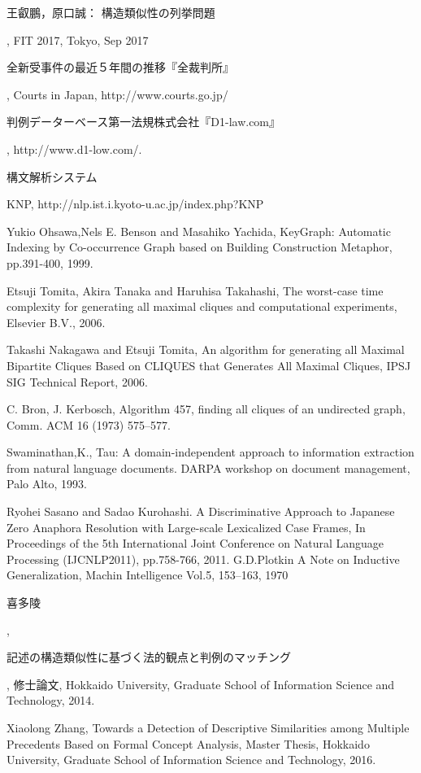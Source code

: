 \renewcommand\bibname{References}
\begin{thebibliography}{9}

%
%
%
\bibitem{}\begin{CJK}{UTF8}{ipxm}王叡鵬，原口誠： 構造類似性の列挙問題\end{CJK}, FIT 2017, Tokyo, Sep 2017

\bibitem{}\begin{CJK}{UTF8}{ipxm}全新受事件の最近５年間の推移『全裁判所』\end{CJK}, Courts in Japan, http://www.courts.go.jp/

\bibitem{}\begin{CJK}{UTF8}{ipxm}判例データーベース第一法規株式会社『D1-law.com』\end{CJK}, http://www.d1-low.com/.

\bibitem{}\begin{CJK}{UTF8}{ipxm}構文解析システム\end{CJK}KNP, http://nlp.ist.i.kyoto-u.ac.jp/index.php?KNP 


\bibitem{}Yukio Ohsawa,Nels E. Benson and Masahiko Yachida, KeyGraph: Automatic Indexing by Co-occurrence Graph based on Building Construction Metaphor,  pp.391-400, 1999.

\bibitem{}Etsuji Tomita, Akira Tanaka and Haruhisa Takahashi, The worst-case time complexity for generating all maximal cliques and computational experiments, Elsevier B.V., 2006.

\bibitem{}Takashi Nakagawa and Etsuji Tomita, An algorithm for generating all Maximal Bipartite Cliques Based on CLIQUES that Generates All Maximal Cliques, IPSJ SIG Technical Report, 2006.

\bibitem{}C. Bron, J. Kerbosch, Algorithm 457, finding all cliques of an undirected graph, Comm. ACM 16 (1973) 575–577.

\bibitem{}Swaminathan,K., Tau: A domain-independent approach to information extraction from natural language documents. DARPA workshop on document management, Palo Alto, 1993.

\bibitem{}Ryohei Sasano and Sadao Kurohashi.
A Discriminative Approach to Japanese Zero Anaphora Resolution with Large-scale Lexicalized Case Frames, In Proceedings of the 5th International Joint Conference on Natural Language Processing (IJCNLP2011), pp.758-766, 2011.
\bibitem{}G.D.Plotkin A Note on Inductive Generalization, Machin Intelligence Vol.5, 153--163, 1970
\bibitem{}\begin{CJK}{UTF8}{ipxm}喜多陵\end{CJK}, \begin{CJK}{UTF8}{ipxm}記述の構造類似性に基づく法的観点と判例のマッチング\end{CJK}, 修士論文, Hokkaido University, Graduate School of Information Science and Technology, 2014.

\bibitem{}Xiaolong Zhang, Towards a Detection of Descriptive Similarities among Multiple Precedents Based on Formal Concept Analysis, Master Thesis, Hokkaido University, Graduate School of Information Science and Technology, 2016.


\end{thebibliography}
